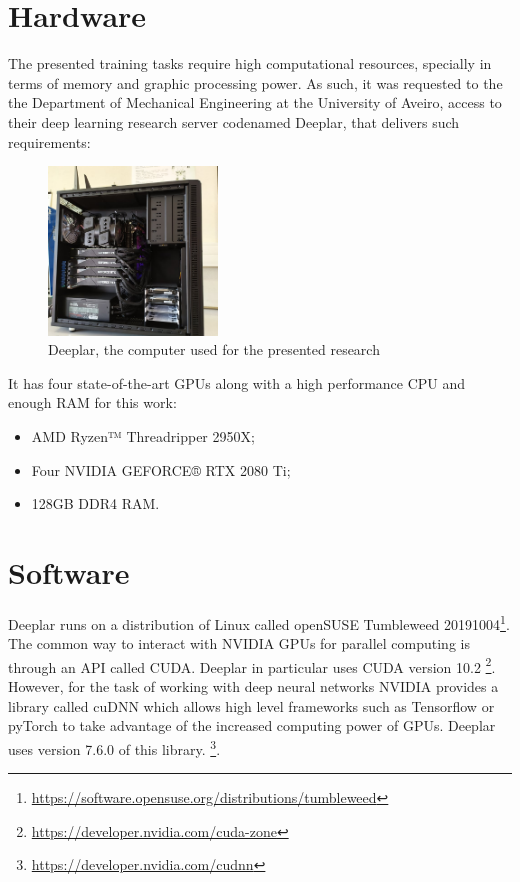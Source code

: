 \section{Hardware}
    The presented training tasks require high computational resources, specially in terms of memory and graphic processing power. As such, it was requested to the the Department of Mechanical Engineering at the University of Aveiro, access to their deep learning research server codenamed Deeplar, that delivers such requirements:
    
    \begin{figure}[ht]
        \centering
        \includegraphics[width=0.4\textwidth]{figs/deeplar.jpg}
        \caption{Deeplar, the computer used for the presented research}
        \label{fig:deeplar}
    \end{figure}
    
    It has four state-of-the-art \ac{GPU}s along with a high performance \ac{CPU} and enough \ac{RAM} for this work:
    
    \begin{itemize}
        \item AMD Ryzen™ Threadripper 2950X;
        \item Four NVIDIA GEFORCE® RTX 2080 Ti;
        \item 128GB DDR4 RAM.
    \end{itemize}

\section{Software}

    Deeplar runs on a distribution of Linux called openSUSE Tumbleweed 20191004\footnote{\url{https://software.opensuse.org/distributions/tumbleweed}}. The common way to interact with NVIDIA GPUs for parallel computing is through an API called CUDA. Deeplar in particular uses CUDA version 10.2 \footnote{\url{https://developer.nvidia.com/cuda-zone}}. However, for the task of working with deep neural networks NVIDIA provides a library called cuDNN which allows high level frameworks such as Tensorflow or pyTorch to take advantage of the increased computing power of GPUs. Deeplar uses version 7.6.0 of this library. \footnote{\url{https://developer.nvidia.com/cudnn}}.
    
